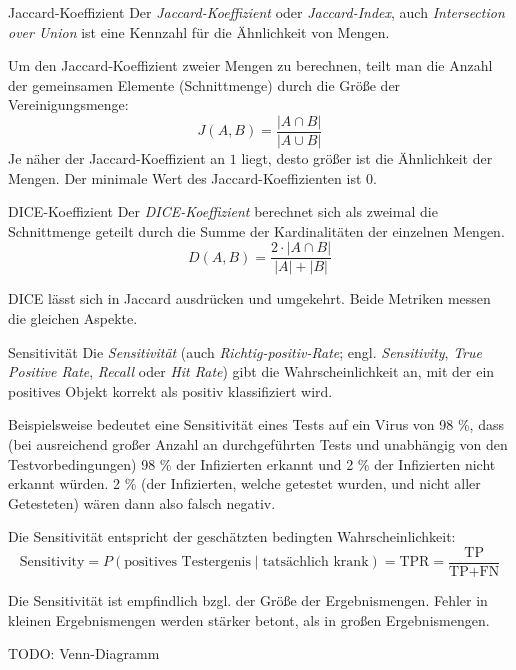 \begin{defi}[Überlappungsmetrik]{Jaccard-Koeffizient}
    Der \emph{Jaccard-Koeffizient} oder \emph{Jaccard-Index}, auch \emph{Intersection over Union} ist eine Kennzahl für die Ähnlichkeit von Mengen.

    Um den Jaccard-Koeffizient zweier Mengen zu berechnen, teilt man die Anzahl der gemeinsamen Elemente (Schnittmenge) durch die Größe der Vereinigungsmenge:
    \[
        J(A, B) = \frac{|A \cap B|}{|A \cup B|}
    \]
    Je näher der Jaccard-Koeffizient an $1$ liegt, desto größer ist die Ähnlichkeit der Mengen.
    Der minimale Wert des Jaccard-Koeffizienten ist $0$.
\end{defi}

\begin{bonus}[Überlappungsmetrik]{DICE-Koeffizient}
    Der \emph{DICE-Koeffizient} berechnet sich als zweimal die Schnittmenge geteilt durch die Summe der Kardinalitäten der einzelnen Mengen.
    \[
        D(A, B) = \frac{2 \cdot |A \cap B|}{|A| +  |B|}
    \]

    DICE lässt sich in Jaccard ausdrücken und umgekehrt.
    Beide Metriken messen die gleichen Aspekte.
\end{bonus}

\begin{defi}[Überlappungsmetrik]{Sensitivität}
    Die \emph{Sensitivität} (auch \emph{Richtig-positiv-Rate}; engl. \emph{Sensitivity}, \emph{True Positive Rate}, \emph{Recall} oder \emph{Hit Rate}) gibt die Wahrscheinlichkeit an, mit der ein positives Objekt korrekt als positiv klassifiziert wird.

    Beispielsweise bedeutet eine Sensitivität eines Tests auf ein Virus von 98 \%, dass (bei ausreichend großer Anzahl an durchgeführten Tests und unabhängig von den Testvorbedingungen) 98 \% der Infizierten erkannt und 2 \% der Infizierten nicht erkannt würden.
    2 \% (der Infizierten, welche getestet wurden, und nicht aller Getesteten) wären dann also falsch negativ.

    Die Sensitivität entspricht der geschätzten bedingten Wahrscheinlichkeit:
    \[
        \text{Sensitivity} = P(\text{positives Testergenis} \mid \text{tatsächlich krank}) = \text{TPR} = \frac{\text{TP}}{\text{TP} + \text{FN}}
    \]

    Die Sensitivität ist empfindlich bzgl. der Größe der Ergebnismengen.
    Fehler in kleinen Ergebnismengen werden stärker betont, als in großen Ergebnismengen.

    TODO: Venn-Diagramm
\end{defi}

